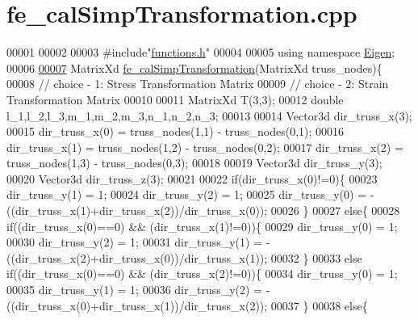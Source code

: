 \hypertarget{fe__cal_simp_transformation_8cpp_source}{}\section{fe\+\_\+cal\+Simp\+Transformation.\+cpp}
\label{fe__cal_simp_transformation_8cpp_source}

\begin{DoxyCode}
00001 
00002 
00003 \textcolor{preprocessor}{#include"\hyperlink{functions_8h}{functions.h}"}
00004 
00005 \textcolor{keyword}{using namespace }\hyperlink{namespace_eigen}{Eigen};
00006 
\hyperlink{fe__cal_simp_transformation_8cpp_ae2eeba997bf4f0bc4749b92130de7ba3}{00007} MatrixXd \hyperlink{fe__cal_simp_transformation_8cpp_ae2eeba997bf4f0bc4749b92130de7ba3}{fe\_calSimpTransformation}(MatrixXd truss\_nodes)\{
00008 \textcolor{comment}{// choice - 1: Stress Transformation Matrix}
00009 \textcolor{comment}{// choice - 2: Strain Transformation Matrix}
00010 
00011     MatrixXd T(3,3);
00012     \textcolor{keywordtype}{double} l\_1,l\_2,l\_3,m\_1,m\_2,m\_3,n\_1,n\_2,n\_3;
00013 
00014     Vector3d dir\_truss\_x(3);
00015     dir\_truss\_x(0) = truss\_nodes(1,1) - truss\_nodes(0,1);
00016     dir\_truss\_x(1) = truss\_nodes(1,2) - truss\_nodes(0,2);
00017     dir\_truss\_x(2) = truss\_nodes(1,3) - truss\_nodes(0,3);
00018 
00019     Vector3d dir\_truss\_y(3);
00020     Vector3d dir\_truss\_z(3);
00021     
00022     \textcolor{keywordflow}{if}(dir\_truss\_x(0)!=0)\{
00023         dir\_truss\_y(1) = 1; 
00024         dir\_truss\_y(2) = 1;
00025         dir\_truss\_y(0) = -((dir\_truss\_x(1)+dir\_truss\_x(2))/dir\_truss\_x(0));
00026     \}
00027     \textcolor{keywordflow}{else}\{
00028         \textcolor{keywordflow}{if}((dir\_truss\_x(0)==0) && (dir\_truss\_x(1)!=0))\{
00029             dir\_truss\_y(0) = 1;
00030             dir\_truss\_y(2) = 1;
00031             dir\_truss\_y(1) = -((dir\_truss\_x(2)+dir\_truss\_x(0))/dir\_truss\_x(1));     
00032         \}
00033         \textcolor{keywordflow}{else} \textcolor{keywordflow}{if}((dir\_truss\_x(0)==0) && (dir\_truss\_x(2)!=0))\{
00034             dir\_truss\_y(0) = 1;
00035             dir\_truss\_y(1) = 1;
00036             dir\_truss\_y(2) = -((dir\_truss\_x(0)+dir\_truss\_x(1))/dir\_truss\_x(2)); 
00037         \}
00038         \textcolor{keywordflow}{else}\{

\end{DoxyCode}
